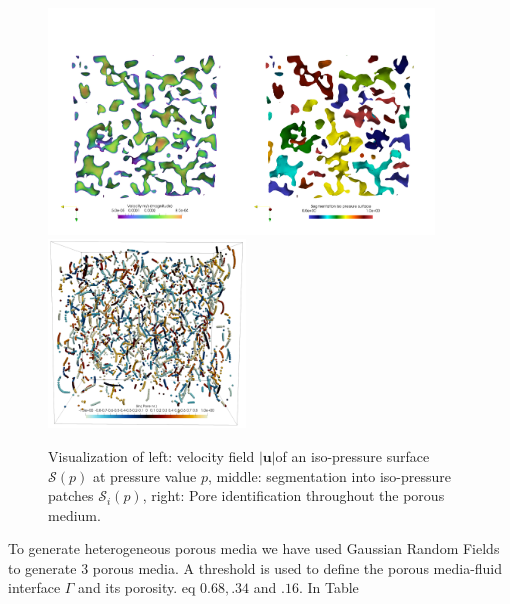 \documentclass[draft]{agujournal2019}
\begin{document}
\begin{figure}[htbp!]\label{fig:segmentation}
\includegraphics[height=6cm]{figures/semgentation_veloctiy_iso_p_surface.png}
\includegraphics[height=5cm]{figures/pores_PM2.png}
\caption{Visualization of left: velocity field $|\mathbf{u}|$of an iso-pressure surface $\mathcal{S}(p)$ at pressure value $p$, middle: segmentation into iso-pressure patches  $\mathcal{S}_i(p)$, right: Pore identification throughout the porous medium. }
\end{figure}

To generate heterogeneous porous media we have used Gaussian Random Fields to generate 3 porous media. A threshold is used to define the porous media-fluid interface $\Gamma$ and its porosity. eq $0.68, .34 $ and $.16$. In Table 
\end{document}
